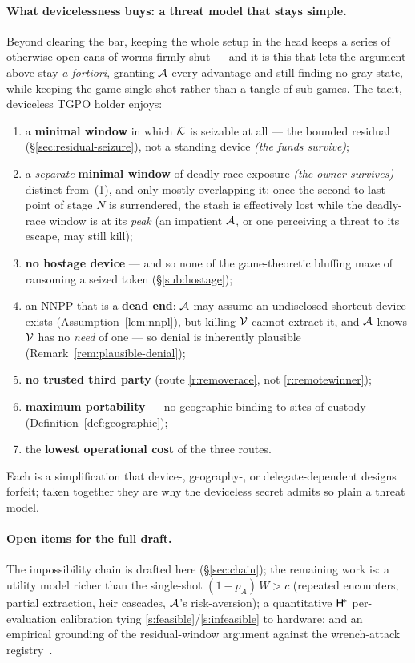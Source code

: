 \paragraph{What devicelessness buys: a threat model that stays simple.}
Beyond clearing the bar, keeping the whole setup in the head keeps a series of
otherwise-open cans of worms firmly shut --- and it is this that lets the argument
above stay \emph{a fortiori}, granting $\mathcal{A}$ every advantage and still
finding no gray state, while keeping the game single-shot rather than a tangle of
sub-games. The
tacit, deviceless TGPO holder enjoys:
\begin{enumerate}[nosep,leftmargin=1.9em]
  \item a \textbf{minimal window} in which $\mathcal{K}$ is seizable at all --- the
        bounded residual (\S\ref{sec:residual-seizure}), not a standing device \emph{(the
        funds survive)};
  \item a \emph{separate} \textbf{minimal window} of deadly-race exposure \emph{(the
        owner survives)} --- distinct from~(1), and only mostly overlapping it: once
        the second-to-last point of stage $N$ is surrendered, the stash is effectively
        lost while the deadly-race window is at its \emph{peak} (an impatient
        $\mathcal{A}$, or one perceiving a threat to its escape, may still kill);
  \item \textbf{no hostage device} --- and so none of the game-theoretic bluffing
        maze of ransoming a seized token (\S\ref{sub:hostage});
  \item an NNPP that is a \textbf{dead end}: $\mathcal{A}$ may assume an undisclosed
        shortcut device exists (Assumption~\ref{lem:nnpl}), but killing $\mathcal{V}$
        cannot extract it, and $\mathcal{A}$ knows $\mathcal{V}$ has no \emph{need} of one
        --- so denial is inherently plausible (Remark~\ref{rem:plausible-denial});
  \item \textbf{no trusted third party} (route \ref{r:removerace}, not
        \ref{r:remotewinner});
  \item \textbf{maximum portability} --- no geographic binding to sites of custody
        (Definition~\ref{def:geographic});
  \item the \textbf{lowest operational cost} of the three routes.
\end{enumerate}
Each is a simplification that device-, geography-, or delegate-dependent designs
forfeit; taken together they are why the deviceless secret admits so plain a threat
model.

\paragraph{Open items for the full draft.}
The impossibility chain is drafted here (\S\ref{sec:chain}); the remaining work
is: a
utility model richer than the single-shot $(1 - p_A)\,W > c$ (repeated
encounters, partial extraction, heir cascades, $\mathcal{A}$'s risk-aversion); a
quantitative $\mathsf{H}^{\!*}$ per-evaluation calibration tying \ref{s:feasible}/\ref{s:infeasible} to
hardware; and an empirical grounding of the residual-window argument against the
wrench-attack registry~\cite{lopp-attacks}.

